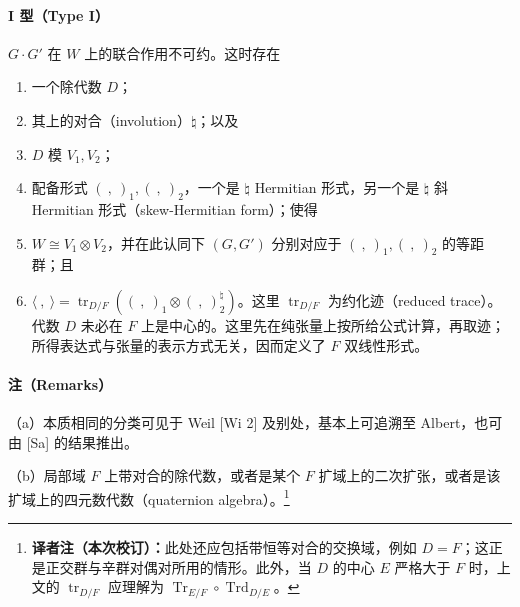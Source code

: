 \paragraph*{I 型（Type I）}
$G\cdot G'$ 在 $W$ 上的联合作用不可约。这时存在
\begin{enumerate}
\item[(a)] 一个除代数 $D$；
\item[(b)] 其上的对合（involution）$\natural$；以及
\item[(c)] $D$ 模 $V_1,V_2$；
\item[(d)] 配备形式 $(\ ,\ )_1,(\ ,\ )_2$，一个是 $\natural$ Hermitian 形式，另一个是 $\natural$ 斜 Hermitian 形式（skew-Hermitian form）；使得
\item[(e)] $W\cong V_1\otimes V_2$，并在此认同下 $(G,G')$ 分别对应于 $(\ ,\ )_1,(\ ,\ )_2$ 的等距群；且
\item[(f)] $\langle\ ,\ \rangle=\operatorname{tr}_{D/F}((\ ,\ )_1\otimes(\ ,\ )_2^\natural)$。这里 $\operatorname{tr}_{D/F}$ 为约化迹（reduced trace）。代数 $D$ 未必在 $F$ 上是中心的。这里先在纯张量上按所给公式计算，再取迹；所得表达式与张量的表示方式无关，因而定义了 $F$ 双线性形式。
\end{enumerate}
\paragraph*{注（Remarks）}
（a）本质相同的分类可见于 Weil [Wi 2] 及别处，基本上可追溯至 Albert，也可由 [Sa] 的结果推出。

（b）局部域 $F$ 上带对合的除代数，或者是某个 $F$ 扩域上的二次扩张，或者是该扩域上的四元数代数（quaternion algebra）。\footnote{\textbf{译者注（本次校订）：}此处还应包括带恒等对合的交换域，例如 $D=F$；这正是正交群与辛群对偶对所用的情形。此外，当 $D$ 的中心 $E$ 严格大于 $F$ 时，上文的 $\operatorname{tr}_{D/F}$ 应理解为 $\operatorname{Tr}_{E/F}\circ\operatorname{Trd}_{D/E}$。}

